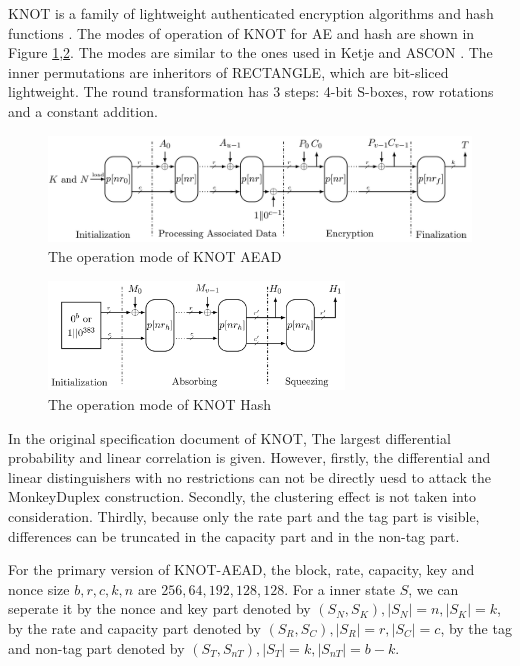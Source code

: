 KNOT is a family of lightweight authenticated encryption algorithms and hash functions \cite{zhang2019knot}. The modes of operation of KNOT for AE and hash are shown in Figure \ref{fig:mode_aead},\ref{fig:mode_hash}. The modes are similar to the ones used in Ketje \cite{bertoni2014ketje} and ASCON \cite{dobraunig2016ascon}. The inner permutations are inheritors of RECTANGLE, which are bit-sliced lightweight. The round transformation has 3 steps: 4-bit S-boxes, row rotations and a constant addition. 

\begin{figure}
	\centering
	\includegraphics[width=1\textwidth]{fig/mode_aead.PNG}
	\caption{The operation mode of KNOT AEAD} \label{fig:mode_aead}
\end{figure}

\begin{figure}
	\centering
	\includegraphics[width=0.7\textwidth]{fig/mode_hash.PNG}
	\caption{The operation mode of KNOT Hash} \label{fig:mode_hash}
\end{figure}

In the original specification document of KNOT, The largest differential probability and linear correlation is given. However, firstly, the differential and linear distinguishers with no restrictions can not be directly uesd to attack the MonkeyDuplex construction. Secondly, the clustering effect is not taken into consideration. Thirdly, because only the rate part and the tag part is visible, differences can be truncated in the capacity part and in the non-tag part. 

For the primary version of KNOT-AEAD, the block, rate, capacity, key and nonce size $b,r,c,k,n$ are $256,64,192,128,128$. For a inner state $S$, we can seperate it by the nonce and key part denoted by $(S_N,S_K),|S_N|=n,|S_K|=k$, by the rate and capacity part denoted by $(S_R,S_C),|S_R|=r,|S_C|=c$, by the tag and non-tag part denoted by $(S_T,S_{nT}),|S_T|=k,|S_{nT}|=b-k$.

